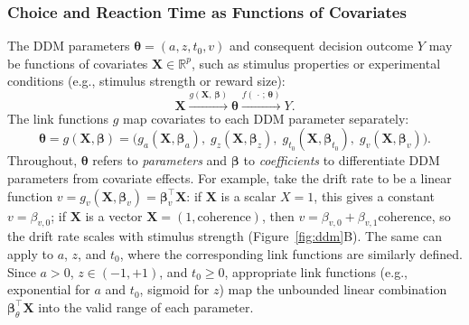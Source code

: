\documentclass[00-main.tex]{subfiles}
\begin{document}
\subsubsection{Choice and Reaction Time as Functions of Covariates}\label{sec:covariates}
The DDM parameters $\bm{\theta} = (a, z, t_0, v)$ and consequent decision outcome $Y$ may be functions of covariates $\bm{X} \in \mathbb{R}^p$, such as stimulus properties or experimental conditions (e.g., stimulus strength or reward size):
\begin{equation}
    \bm{X} \xrightarrow{g(\bm{X},\,\bm{\beta})} \bm{\theta}
    \xrightarrow{f(\,\cdot\,;\,\bm{\theta})} Y.
\end{equation}
The link functions $g$ map covariates to each DDM parameter separately:
\begin{equation}\label{eq:g}
    \bm{\theta} = g(\bm{X}, \bm{\beta}) = \bigl(g_a(\bm{X}, \bm{\beta}_a),\; g_z(\bm{X}, \bm{\beta}_z),\; g_{t_0}(\bm{X}, \bm{\beta}_{t_0}),\; g_v(\bm{X}, \bm{\beta}_v)\bigr).
\end{equation}
Throughout, $\bm{\theta}$ refers to \emph{parameters} and $\bm{\beta}$ to \emph{coefficients} to differentiate DDM parameters from covariate effects. For example, take the drift rate to be a linear function $v = g_v(\bm{X}, \bm{\beta}_v) = \bm{\beta}_v^\top \bm{X}$: if $\bm{X}$ is a scalar $X=1$, this gives a constant $v = \beta_{v,0}$; if $\bm{X}$ is a vector $\bm{X} = (1, \mathrm{coherence})$, then $v = \beta_{v,0} + \beta_{v,1}\mathrm{coherence}$, so the drift rate scales with stimulus strength (Figure~\ref{fig:ddm}B). The same can apply to $a$, $z$, and $t_0$, where the corresponding link functions are similarly defined. Since $a > 0$, $z \in (-1, +1)$, and $t_0 \geq 0$, appropriate link functions (e.g., exponential for $a$ and $t_0$, sigmoid for $z$) map the unbounded linear combination $\bm{\beta}_\theta^\top \bm{X}$ into the valid range of each parameter.
\end{document}
